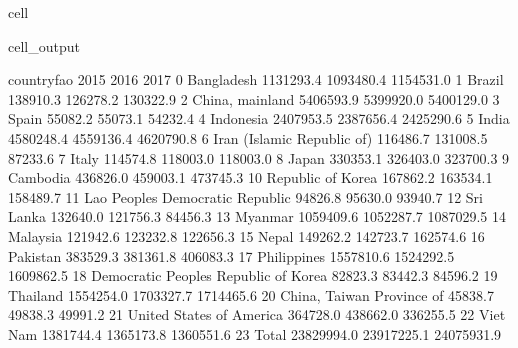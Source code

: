 \documentclass[letterpaper,10pt,english]{jupyterBook}
\begin{document}
\begin{sphinxuseclass}{cell}
\begin{sphinxVerbatimOutput}
\begin{sphinxuseclass}{cell_output}
\begin{sphinxVerbatim}[commandchars=\\\{\}]
                              country\PYGZus{}fao        2015        2016        2017  \PYGZbs{}
0                              Bangladesh   1131293.4   1093480.4   1154531.0   
1                                  Brazil    138910.3    126278.2    130322.9   
2                         China, mainland   5406593.9   5399920.0   5400129.0   
3                                   Spain     55082.2     55073.1     54232.4   
4                               Indonesia   2407953.5   2387656.4   2425290.6   
5                                   India   4580248.4   4559136.4   4620790.8   
6              Iran (Islamic Republic of)    116486.7    131008.5     87233.6   
7                                   Italy    114574.8    118003.0    118003.0   
8                                   Japan    330353.1    326403.0    323700.3   
9                                Cambodia    436826.0    459003.1    473745.3   
10                      Republic of Korea    167862.2    163534.1    158489.7   
11       Lao People\PYGZsq{}s Democratic Republic     94826.8     95630.0     93940.7   
12                              Sri Lanka    132640.0    121756.3     84456.3   
13                                Myanmar   1059409.6   1052287.7   1087029.5   
14                               Malaysia    121942.6    123232.8    122656.3   
15                                  Nepal    149262.2    142723.7    162574.6   
16                               Pakistan    383529.3    381361.8    406083.3   
17                            Philippines   1557810.6   1524292.5   1609862.5   
18  Democratic People\PYGZsq{}s Republic of Korea     82823.3     83442.3     84596.2   
19                               Thailand   1554254.0   1703327.7   1714465.6   
20              China, Taiwan Province of     45838.7     49838.3     49991.2   
21               United States of America    364728.0    438662.0    336255.5   
22                               Viet Nam   1381744.4   1365173.8   1360551.6   
23                                  Total  23829994.0  23917225.1  24075931.9   


\end{sphinxVerbatim}
\end{sphinxuseclass}
\end{sphinxVerbatimOutput}
\end{sphinxuseclass}
\end{document}
